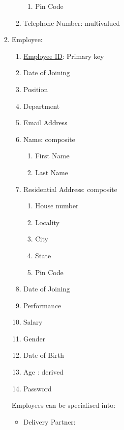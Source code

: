 \documentclass[12pt]{report}
\begin{document}
\begin{enumerate}
\begin{enumerate}
\begin{enumerate}
                        \item Pin Code
                    \end{enumerate}
                \item Telephone Number: multivalued
            \end{enumerate}
        \item Employee:
            \begin{enumerate}
                \item \underline{Employee ID}: Primary key
                \item Date of Joining
                \item Position
                \item Department
                \item Email Address
                \item Name: composite
                    \begin{enumerate}
                        \item First Name
                        \item Last Name
                    \end{enumerate}
                \item Residential Address: composite
                    \begin{enumerate}
                        \item House number
                        \item Locality
                        \item City
                        \item State
                        \item Pin Code
                    \end{enumerate}
                \item Date of Joining
                \item Performance
                \item Salary
                \item Gender
                \item Date of Birth
                \item Age : derived
                \item Password
            \end{enumerate}
            Employees can be specialised into:
            \begin{itemize}
                \item Delivery Partner:

\end{itemize}
\end{enumerate}
\end{document}
